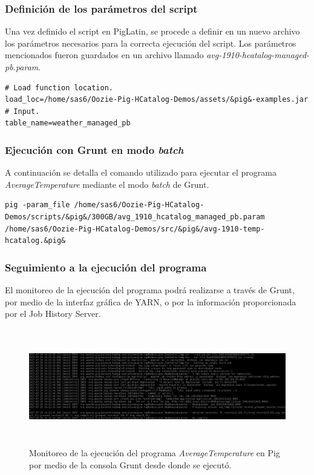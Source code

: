 \subsubsection{Definición de los parámetros del script}

Una vez definido el script en PigLatin, se procede a definir en un nuevo archivo los parámetros necesarios para la correcta ejecución del script. Los parámetros mencionados fueron guardados en un archivo llamado \textit{avg-1910-hcatalog-managed-pb.param}.

\begin{lstlisting}[linewidth=\columnwidth,breaklines=true]
# Load function location.
load_loc=/home/sas6/Oozie-Pig-HCatalog-Demos/assets/&pig&-examples.jar
# Input.
table_name=weather_managed_pb
\end{lstlisting}

\subsubsection{Ejecución con Grunt en modo \textit{batch}}

A continuación se detalla el comando utilizado para ejecutar el programa \textit{AverageTemperature} mediante el modo \textit{batch} de Grunt.

\begin{lstlisting}[linewidth=\columnwidth,breaklines=true]
pig -param_file /home/sas6/Oozie-Pig-HCatalog-Demos/scripts/&pig&/300GB/avg_1910_hcatalog_managed_pb.param /home/sas6/Oozie-Pig-HCatalog-Demos/src/&pig&/avg-1910-temp-hcatalog.&pig&
\end{lstlisting}

\subsubsection{Seguimiento a la ejecución del programa}

El monitoreo de la ejecución del programa podrá realizarse a través de Grunt, por medio de la interfaz gráfica de YARN, o por la información proporcionada por el Job History Server.

\begin{figure}[H]
  \centering
      \includegraphics[width=\textwidth, height=2.0in]{fig/05/04}
  \caption{Monitoreo de la ejecución del programa \textit{AverageTemperature} en Pig por medio de la consola Grunt desde donde se ejecutó.}
\end{figure}

